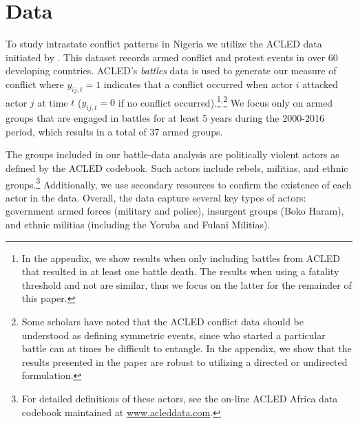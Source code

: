 \section*{Data}

To study intrastate conflict patterns in Nigeria we utilize the ACLED data initiated by \citet{raleigh:etal:2010}. This dataset records armed conflict and protest events in over 60 developing countries. ACLED's \textit{battles} data is used to generate our measure of conflict where $y_{ij,t} = 1$ indicates that a conflict occurred when actor $i$ attacked actor $j$ at time $t$ ($y_{ij,t} = 0$ if no conflict occurred).\footnote{In the appendix, we show results when only including battles from ACLED that resulted in at least one battle death. The results when using a fatality threshold and not are similar, thus we focus on the latter for the remainder of this paper.}$^{, }$\footnote{Some scholars have noted that the ACLED conflict data should be understood as defining symmetric events, since who started a particular battle can at times be difficult to entangle. In the appendix, we show that the results presented in the paper are robust to utilizing a directed or undirected formulation.}  We focus only on armed groups that are engaged in battles for at least 5 years during the 2000-2016 period, which results in a total of 37 armed groups.

The groups included in our battle-data analysis are politically violent actors as defined by the ACLED codebook. Such actors include rebels, militias, and ethnic groups.\footnote{For detailed definitions of these actors, see the on-line ACLED Africa data codebook maintained at \url{www.acleddata.com}.} Additionally, we use secondary resources to confirm the existence of each actor in the data. Overall, the data capture several key types of actors: government armed forces (military and police), insurgent groups (Boko Haram), and ethnic militias (including the Yoruba and Fulani Militias). 

